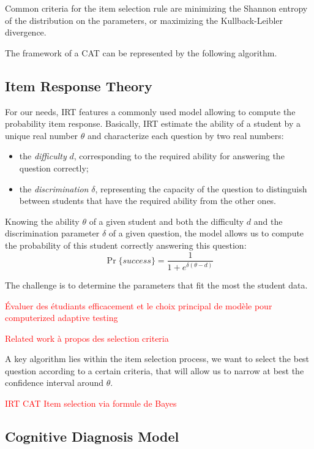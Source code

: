 \documentclass{sig-alternate}
\newcommand\alert[1]{\textcolor{red}{#1}}
\begin{document}
Common criteria for the item selection rule are minimizing the Shannon entropy of the distribution on the parameters, or maximizing the Kullback-Leibler divergence. %

The framework of a CAT can be represented by the following algorithm.

\subsection{Item Response Theory}

For our needs, IRT features a commonly used model allowing to compute the probability item response. Basically, IRT estimate the ability of a student by a unique real number $\theta$ and characterize each question by two real numbers:

\begin{itemize}
\item the \emph{difficulty} $d$, corresponding to the required ability for answering the question correctly; %
\item the \emph{discrimination} $\delta$, representing the capacity of the question to distinguish between students that have the required ability from the other ones.
\end{itemize}

Knowing the ability $\theta$ of a given student and both the difficulty $d$ and the discrimination parameter $\delta$ of a given question, the model allows us to compute the probability of this student correctly answering this question:
\[ \Pr\{success\} = \frac1{1+e^{\delta(\theta - d)}} \]

The challenge is to determine the parameters that fit the most the student data.

\alert{Évaluer des étudiants efficacement et le choix principal de modèle pour computerized adaptive testing}

\alert{Related work à propos des selection criteria}

A key algorithm lies within the item selection process, we want to select the best question according to a certain criteria, that will allow us to narrow at best the confidence interval around $\theta$.

\alert{IRT CAT}
\alert{Item selection via formule de Bayes}

\subsection{Cognitive Diagnosis Model}
\end{document}
